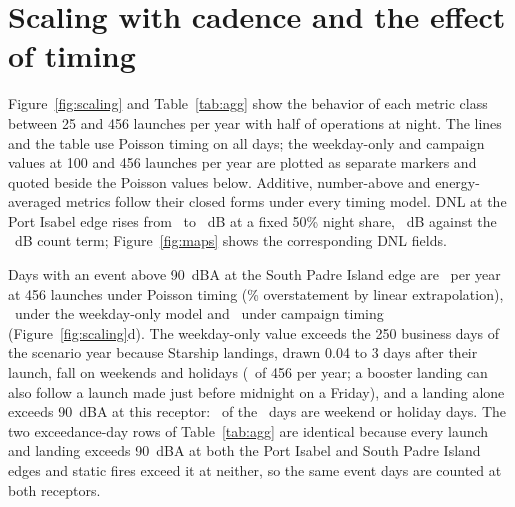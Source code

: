 \documentclass[11pt]{article}
\begin{document}
\begin{table}[htbp]
\caption{Verification against values stated in the 2025 Tiered EA.}
\label{tab:verif}
\centering\footnotesize
\tableVerification
\end{table}

\section{Scaling with cadence and the effect of timing}
\label{sec:scaling}

Figure~\ref{fig:scaling} and Table~\ref{tab:agg} show the behavior of each metric class between 25 and 456 launches per year with half of operations at night. The lines and the table use Poisson timing on all days; the weekday-only and campaign values at 100 and 456 launches per year are plotted as separate markers and quoted beside the Poisson values below. Additive, number-above and energy-averaged metrics follow their closed forms under every timing model. DNL at the Port Isabel edge rises from \valEOneNTwoFiveLdnPortisabel~to \valEOneNFourFiveSixLdnPortisabel~dB at a fixed 50\% night share, \valEOneLdnPortisabelRiseTwoFiveFourFiveSixDb~dB against the \valCfCountTermTwoFiveFourFiveSixDb~dB count term; Figure~\ref{fig:maps} shows the corresponding DNL fields.

Days with an event above 90~dBA at the South Padre Island edge are \valEOneSimDaysNineZeroSouthPadreIslandNearestEdge~per year at 456 launches under Poisson timing (\valEOneRelerrPctDaysNineZeroSouthPadreIslandNearestEdge\% overstatement by linear extrapolation), \valETwoWeekdayDaysNineZeroSpi~under the weekday-only model and \valETwoCampaignDaysNineZeroSpi~under campaign timing (Figure~\ref{fig:scaling}d). The weekday-only value exceeds the 250 business days of the scenario year because Starship landings, drawn 0.04 to 3 days after their launch, fall on weekends and holidays (\valETwoWeekdaySsLandingsNonbusiness~of 456 per year; a booster landing can also follow a launch made just before midnight on a Friday), and a landing alone exceeds 90~dBA at this receptor: \valETwoWeekdayDaysNineZeroNbSpi~of the \valETwoWeekdayDaysNineZeroSpi~days are weekend or holiday days. The two exceedance-day rows of Table~\ref{tab:agg} are identical because every launch and landing exceeds 90~dBA at both the Port Isabel and South Padre Island edges and static fires exceed it at neither, so the same event days are counted at both receptors.
\end{document}

